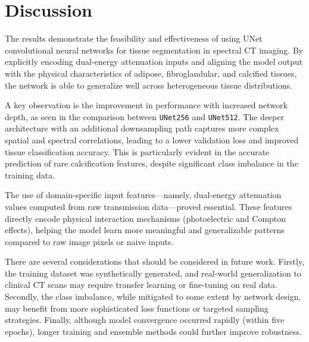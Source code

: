 \section{Discussion}\label{sec:discussion}

The results demonstrate the feasibility and effectiveness of using UNet convolutional neural networks for 
tissue segmentation in spectral CT imaging. By explicitly encoding dual-energy attenuation inputs and aligning the model 
output with the physical characteristics of adipose, fibroglandular, and calcified tissues, the network is able to 
generalize well across heterogeneous tissue distributions.

A key observation is the improvement in performance with increased network depth, as seen in the comparison between 
\texttt{UNet256} and \texttt{UNet512}. The deeper architecture with an additional downsampling path captures more 
complex spatial and spectral correlations, leading to a lower validation loss and improved tissue classification 
accuracy. This is particularly evident in the accurate prediction of rare calcification features, despite significant 
class imbalance in the training data.

The use of domain-specific input features—namely, dual-energy attenuation values computed from raw transmission 
data—proved essential. These features directly encode physical interaction mechanisms (photoelectric and Compton 
effects), helping the model learn more meaningful and generalizable patterns compared to raw image pixels or naive 
inputs.

There are several considerations that should be considered in future work. Firstly, the training dataset was synthetically 
generated, and real-world generalization to clinical CT scans may require transfer learning or fine-tuning on real data. 
Secondly, the class imbalance, while mitigated to some extent by network design, may benefit from more sophisticated loss 
functions or targeted sampling strategies. Finally, although model convergence occurred rapidly (within five epochs), longer 
training and ensemble methods could further improve robustness.

